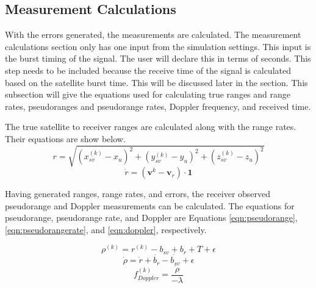 \documentclass[12pt]{report}
\begin{document}
\subsection{Measurement Calculations}
With the errors generated, the measurements are calculated. The measurement calculations section only has one input from the simulation settings. This input is the burst timing of the signal. The user will declare this in terms of seconds. This step needs to be included because the receive time of the signal is calculated based on the satellite burst time. This will be discussed later in the section. This subsection will give the equations used for calculating true ranges and range rates, pseudoranges and pseudorange rates, Doppler frequency, and received time.

The true satellite to receiver ranges are calculated along with the range rates. Their equations are show below.
\begin{equation}
    r = \sqrt{(x^{(k)}_{sv} - x_u)^2 + (y^{(k)}_{sv} - y_u)^2 + (z^{(k)}_{sv} - z_u)^2}
    \label{eqn:rangeeqn}
\end{equation}
\begin{equation}
    \dot{r} = (\mathbf{v}^{k} - \mathbf{v}_r) \cdot \mathbf{1}
    \label{eqn:rangerate}
\end{equation}

Having generated ranges, range rates, and errors, the receiver observed pseudorange and Doppler measurements can be calculated. The equations for pseudorange, pseudorange rate, and Doppler are Equations \ref{eqn:pseudorange}, \ref{eqn:pseudorangerate}, and \ref{eqn:doppler}, respectively.

\begin{equation}
    \rho^{(k)} = r^{(k)} - b_{sv} + b_r + T +\epsilon
    \label{eqn:pseudorange}
\end{equation}
\begin{equation}
    \dot{\rho} = \dot{r} + \dot{b_r} - \dot{b_{sv}} + \epsilon
    \label{eqn:pseudorangerate}
\end{equation}
\begin{equation}
    f^{(k)}_{Doppler} = \frac{\dot{\rho}}{-\lambda}
    \label{eqn:doppler}
\end{equation}
\end{document}
